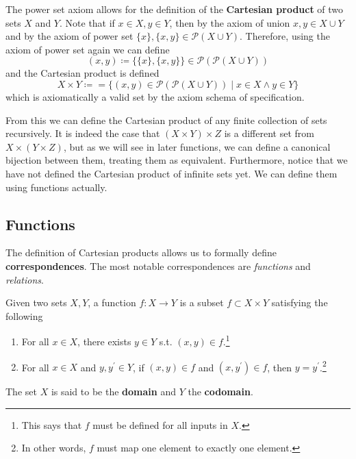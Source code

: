 \documentclass{article}
\begin{document}
    \begin{definition}
      The power set axiom allows for the definition of the \textbf{Cartesian product} of two sets $X$ and $Y$. Note that if $x \in X, y \in Y$, then by the axiom of union $x, y \in X \cup Y$ and by the axiom of power set $\{x\}, \{x, y\} \in \mathcal{P}(X \cup Y)$. Therefore, using the axiom of power set again we can define
      \begin{equation}
        (x, y) \coloneqq \{\{x\}, \{x, y\}\} \in \mathcal{P}(\mathcal{P}(X \cup Y))
      \end{equation} 
      and the Cartesian product is defined 
      \begin{equation}
        X \times Y \coloneqq = \{ (x, y) \in \mathcal{P}(\mathcal{P}(X \cup Y))  \mid x \in X \land y \in Y \}
      \end{equation}
      which is axiomatically a valid set by the axiom schema of specification. 
    \end{definition} 

    From this we can define the Cartesian product of any finite collection of sets recursively. It is indeed the case that $(X \times Y) \times Z$ is a different set from $X \times (Y \times Z)$, but as we will see in later functions, we can define a canonical bijection between them, treating them as equivalent. Furthermore, notice that we have not defined the Cartesian product of infinite sets yet. We can define them using functions actually. 

  \subsection{Functions} 

    The definition of Cartesian products allows us to formally define \textbf{correspondences}. The most notable correspondences are \textit{functions} and \textit{relations}. 

    \begin{definition}[Function]
      Given two sets $X, Y$, a function $f: X \rightarrow Y$ is a subset $f \subset X \times Y$ satisfying the following
      \begin{enumerate}
        \item For all $x \in X$, there exists $y \in Y$ s.t. $(x, y) \in f$.\footnote{This says that $f$ must be defined for all inputs in $X$.}
        \item For all $x \in X$ and $y, y^\prime \in Y$, if $(x, y) \in f$ and $(x, y^\prime) \in f$, then $y = y^\prime$.\footnote{In other words, $f$ must map one element to exactly one element.} 
      \end{enumerate}
      The set $X$ is said to be the \textbf{domain} and $Y$ the \textbf{codomain}. 
    \end{definition}  
\end{document}
